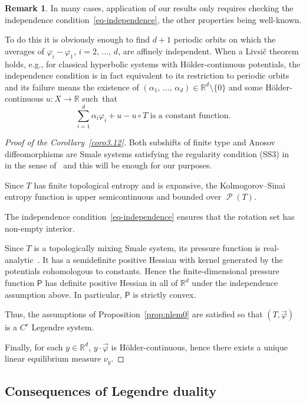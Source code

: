 \documentclass[10pt]{amsart}
\theoremstyle{definition}\newtheorem{defi}[theo]{Definition}\newtheorem{rema}[theo]{Remark}\newtheorem{exam}[theo]{Example}\newtheorem{exem}[theo]{Example}\newtheorem{nota}[theo]{Notation}
\theoremstyle{plain}
\theoremstyle{plain}
\newcommand\vpot{\vec\pot}
\newcommand\Prob{{\operatorname{\mathscr{P}}}}
\newcommand{\Pf}{\mathsf{P}}
\newcommand{\pot}{\varphi}
\newcounter{In}
\newcommand*\8{\infty}
\newcommand\RR{\mathbb{R}}
\begin{document}
\begin{rema}\label{rem-livsic}
In many cases, application of our results only requires checking the independence condition~\eqref{eq-independence}, the other properties being well-known.

To do this it is obviously enough to find $d+1$ periodic orbits on which the averages of $\pot_i-\pot_1$, $i=2,\,\dots,\,d$, are affinely independent. When a Livsič theorem holds, e.g., for classical hyperbolic systems with H\"older-continuous potentials, the independence condition is in fact equivalent to its restriction to periodic orbits and its failure means the existence of $(\alpha_1,\,\dots,\,\alpha_d)\in\RR^d\setminus\{0\}$ and some H\"older-continuous $u:X\to\RR$ such~that
\[
\sum_{i=1}^d \alpha_i\pot_i + u-u\circ T \text{ is a constant function}.
\]
\end{rema}


\begin{proof}[Proof of the Corollary~\ref{coro3.12}]
Both subshifts of finite type and Anosov diffeomorphisms are Smale systems satisfying the regularity condition (SS3) in~\cite{Ruelle-book} in the sense of~\cite[7.1, 7.11]{Ruelle-book} and this will be enough for our purposes.

Since $T$ has finite topological entropy and is expansive, the Kolmogorov--Sinai entropy function is upper semicontinuous and bounded over $\Prob(T)$.

The independence condition~\eqref{eq-independence} ensures that the rotation set has non-empty interior.

Since $T$ is a topologically mixing Smale system, its pressure function is real-analytic~\cite[7.10]{Ruelle-book}. It has a semidefinite positive Hessian with kernel generated by the potentials cohomologous to constants. Hence the finite-dimensional pressure function $\Pf$ has definite positive Hessian in all of $\RR^d$ under the independence assumption above. In particular, $\Pf$ is strictly convex.

Thus, the assumptions of Proposition~\ref{prop:nlem0} are satisfied so that $(T,\vpot)$ is a $C^r$ Legendre system.

Finally, for each $ y\in\RR^d$, $ y\cdot\vpot$ is H\"older-continuous, hence there exists a unique linear equilibrium measure $\nu_{ y}$.
\end{proof}



\subsection{Consequences of Legendre duality}
\end{document}

